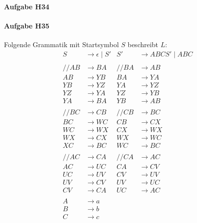 \documentclass[11pt]{article}
\begin{document}
\paragraph{Aufgabe H34}


\paragraph{Aufgabe H35} Folgende Grammatik mit Startsymbol $S$ beschreibt $L$:
\begin{align*}
S &\rightarrow \epsilon \mid S'	& S' &\rightarrow ABCS' \mid ABC	    \\\\
//AB &\rightarrow BA 	& //BA &\rightarrow AB	\\
AB &\rightarrow YB 		& BA &\rightarrow YA	\\
YB &\rightarrow YZ		& YA &\rightarrow YZ	\\
YZ &\rightarrow YA		& YZ &\rightarrow YB	\\
YA &\rightarrow  BA		& YB &\rightarrow AB	\\\\
//BC &\rightarrow CB 	& //CB &\rightarrow BC	\\
BC &\rightarrow WC		& CB &\rightarrow CX	\\
WC &\rightarrow WX		& CX &\rightarrow WX	\\
WX &\rightarrow CX		& WX &\rightarrow WC	\\
XC &\rightarrow BC		& WC &\rightarrow BC	\\\\
//AC &\rightarrow CA 	& //CA &\rightarrow AC	\\
AC &\rightarrow UC		& CA &\rightarrow CV	\\
UC &\rightarrow UV		& CV &\rightarrow UV	\\
UV &\rightarrow CV		& UV &\rightarrow UC	\\
CV &\rightarrow CA		& UC &\rightarrow AC	\\\\
A &\rightarrow a								\\
B &\rightarrow b								\\
C &\rightarrow c								\\
\end{align*}
\end{document}

